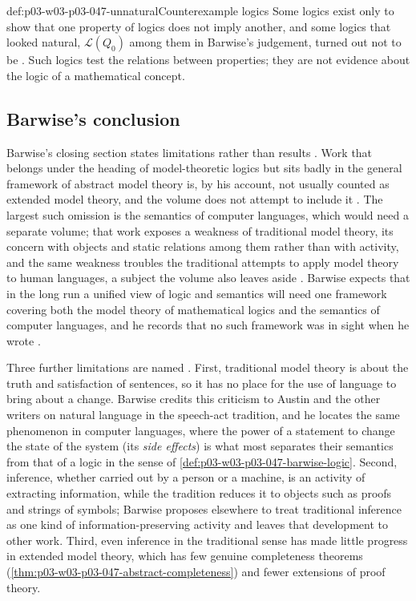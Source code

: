 \begin{hbwarning}{def:p03-w03-p03-047-unnatural}{Counterexample logics}
Some logics exist only to show that one property of logics does not imply
another, and some logics that looked natural, \(\mathscr L(Q_0)\) among them
in Barwise's judgement, turned out not to be
\cite[Ch.~I, \S2.9, pp.~21--22]{Barwise1985BackgroundAims}.  Such logics test the
relations between properties; they are not evidence about the logic of a
mathematical concept.
\end{hbwarning}

\subsection{Barwise's conclusion}

Barwise's closing section states limitations rather than results
\cite[Ch.~I, \S3, pp.~22--23]{Barwise1985BackgroundAims}.  Work that belongs
under the heading of model-theoretic logics but sits badly in the general
framework of abstract model theory is, by his account, not usually counted as
extended model theory, and the volume does not attempt to include it
\cite[Ch.~I, \S3, p.~22]{Barwise1985BackgroundAims}.  The largest such omission
is the semantics of computer languages, which would need a separate volume;
that work exposes a weakness of traditional model theory, its concern with
objects and static relations among them rather than with activity, and the
same weakness troubles the traditional attempts to apply model theory to
human languages, a subject the volume also leaves aside
\cite[Ch.~I, \S3, p.~22]{Barwise1985BackgroundAims}.  Barwise expects that
in the long run a unified view of logic and semantics will need one
framework covering both the model theory of mathematical logics and the
semantics of computer languages, and he records that no such framework was
in sight when he wrote \cite[Ch.~I, \S3, p.~22]{Barwise1985BackgroundAims}.

Three further limitations are named \cite[Ch.~I, \S3, p.~22]{Barwise1985BackgroundAims}.
First, traditional model theory is about the truth and satisfaction of
sentences, so it has no place for the use of language to bring about a
change.  Barwise credits this criticism to Austin and the other writers on
natural language in the speech-act tradition, and he locates the same
phenomenon in computer languages, where the power of a statement to change
the state of the system (its \emph{side effects}) is what most separates
their semantics from that of a logic in the sense of
\cref{def:p03-w03-p03-047-barwise-logic}.  Second, inference, whether
carried out by a person or a machine, is an activity of extracting
information, while the tradition reduces it to objects such as proofs and
strings of symbols; Barwise proposes elsewhere to treat traditional
inference as one kind of information-preserving activity and leaves that
development to other work.  Third, even inference in the traditional sense
has made little progress in extended model theory, which has few genuine
completeness theorems (\cref{thm:p03-w03-p03-047-abstract-completeness}) and
fewer extensions of proof theory.

